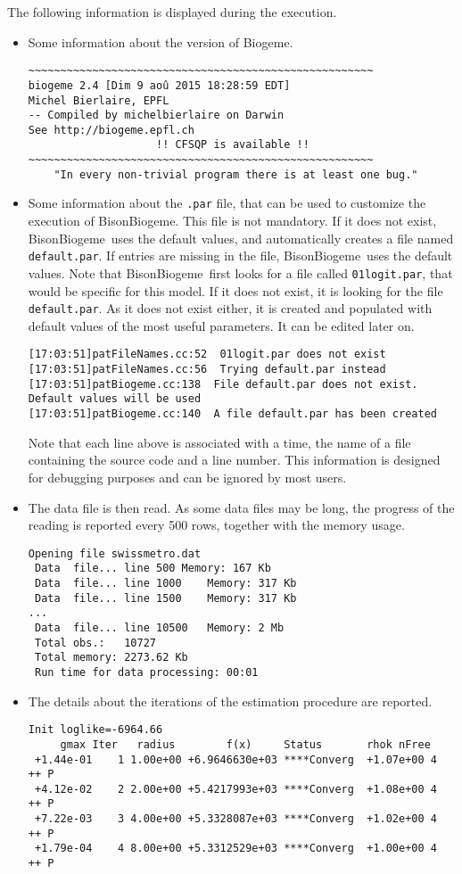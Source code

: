 \documentclass[12pt,a4paper]{article}
\newcommand{\BBIOGEME}{BisonBiogeme}
\begin{document}
The following information is displayed during the execution.
\begin{itemize}
\item Some information about the version of Biogeme.

\begin{lstlisting}[basicstyle=\ttfamily\tiny]
~~~~~~~~~~~~~~~~~~~~~~~~~~~~~~~~~~~~~~~~~~~~~~~~~~~~~~
biogeme 2.4 [Dim 9 aoû 2015 18:28:59 EDT]
Michel Bierlaire, EPFL
-- Compiled by michelbierlaire on Darwin
See http://biogeme.epfl.ch
                    !! CFSQP is available !!
~~~~~~~~~~~~~~~~~~~~~~~~~~~~~~~~~~~~~~~~~~~~~~~~~~~~~~
	"In every non-trivial program there is at least one bug."
\end{lstlisting}
\item Some information about the \lstinline$.par$ file, that can be
  used to customize the execution of \BBIOGEME. This file is not mandatory. If it does not exist, \BBIOGEME\ uses the default values, and automatically creates a file named \lstinline+default.par+.
If entries are missing in the file, \BBIOGEME\ uses the default values.
Note that \BBIOGEME\ first looks for a file called
\lstinline$01logit.par$, that would be specific for this 
model. If it does not exist, it is looking for the file
\lstinline+default.par+. As it does not exist either, it is created
and populated with default values of the most useful parameters. It
can be edited later on. 
\begin{lstlisting}[basicstyle=\ttfamily\tiny]
[17:03:51]patFileNames.cc:52  01logit.par does not exist
[17:03:51]patFileNames.cc:56  Trying default.par instead
[17:03:51]patBiogeme.cc:138  File default.par does not exist. Default values will be used
[17:03:51]patBiogeme.cc:140  A file default.par has been created
\end{lstlisting}
Note that each line above is associated with a time, the name of a file
containing the source code and a line number. This
information is designed for debugging purposes and can be ignored by
most users. 
\item The data file is then read. As some data files may be long, the
  progress of the reading is reported every 500 rows, together with
  the memory usage. 
\begin{lstlisting}[basicstyle=\ttfamily\tiny]
 Opening file swissmetro.dat
 Data  file... line 500	Memory: 167 Kb
 Data  file... line 1000	Memory: 317 Kb
 Data  file... line 1500	Memory: 317 Kb
...
 Data  file... line 10500	Memory: 2 Mb
 Total obs.:   10727
 Total memory: 2273.62 Kb
 Run time for data processing: 00:01
\end{lstlisting}
\item The details about the iterations of the estimation procedure are
  reported. 
\begin{lstlisting}[basicstyle=\ttfamily\tiny]
 Init loglike=-6964.66
     gmax Iter   radius        f(x)     Status       rhok nFree
 +1.44e-01    1 1.00e+00 +6.9646630e+03 ****Converg  +1.07e+00 4  ++ P
 +4.12e-02    2 2.00e+00 +5.4217993e+03 ****Converg  +1.08e+00 4  ++ P
 +7.22e-03    3 4.00e+00 +5.3328087e+03 ****Converg  +1.02e+00 4  ++ P
 +1.79e-04    4 8.00e+00 +5.3312529e+03 ****Converg  +1.00e+00 4  ++ P


\end{lstlisting}
\end{itemize}
\end{document}
